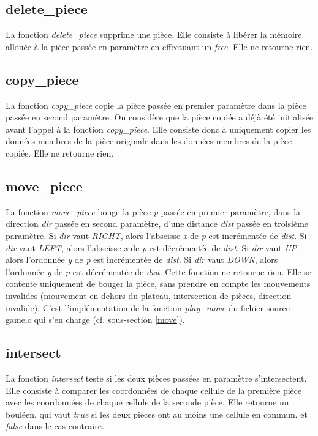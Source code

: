 \documentclass{report}
\begin{document}
\subsection{delete\_piece}
\label{del}
La fonction \emph{delete\_piece} supprime une pièce. Elle consiste à libérer la mémoire allouée à la pièce passée en paramètre en effectuant un \emph{free}. Elle ne retourne rien.
\subsection{copy\_piece}
\label{copy}
La fonction \emph{copy\_piece} copie la pièce passée en premier paramètre dans la pièce passée en second paramètre. On considère que la pièce copiée a déjà été initialisée avant l'appel à la fonction \emph{copy\_piece}. Elle consiste donc à uniquement copier les données membres de la pièce originale dans les données membres de la pièce copiée. Elle ne retourne rien.
\subsection{move\_piece}
La fonction \emph{move\_piece} bouge la pièce \emph{p} passée en premier paramètre, dans la direction \emph{dir} passée en second paramètre, d'une distance \emph{dist} passée en troisième paramètre. Si \emph{dir} vaut \emph{RIGHT}, alors l'abscisse \emph{x} de \emph{p} est incrémentée de \emph{dist}. Si \emph{dir} vaut \emph{LEFT}, alors l'abscisse \emph{x} de \emph{p} est décrémentée de \emph{dist}. Si \emph{dir} vaut \emph{UP}, alors l'ordonnée \emph{y} de \emph{p} est incrémentée de \emph{dist}. Si \emph{dir} vaut \emph{DOWN}, alors l'ordonnée \emph{y} de \emph{p} est décrémentée de \emph{dist}. Cette fonction ne retourne rien. Elle se contente uniquement de bouger la pièce, sans prendre en compte les mouvements invalides (mouvement en dehors du plateau, intersection de pièces, direction invalide). C'est l'implémentation de la fonction \emph{play\_move} du fichier source game.c qui s'en charge (cf. sous-section \ref{move}).
\subsection{intersect}
La fonction \emph{intersect} teste si les deux pièces passées en paramètre s'intersectent. Elle consiste à comparer les coordonnées de chaque cellule de la première pièce avec les coordonnées de chaque cellule de la seconde pièce. Elle retourne un bouléen, qui vaut \emph{true} si les deux pièces ont au moins une cellule en commun, et \emph{false} dans le cas contraire.
\end{document}
